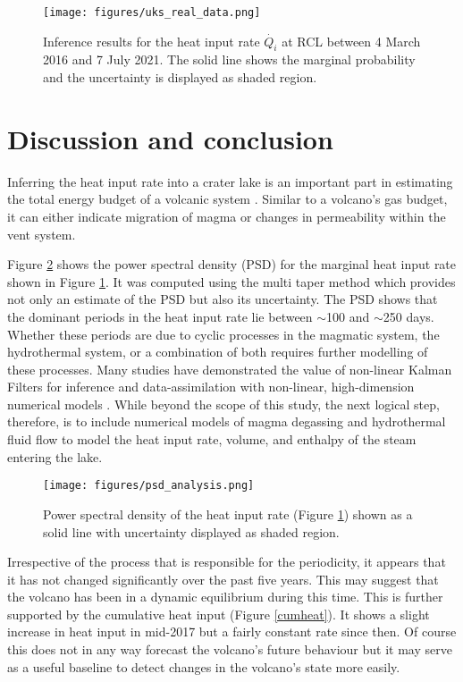\documentclass{bmcart}
\begin{document}
\begin{figure}
 	\texttt{[image: figures/uks\_real\_data.png]}  
 	\caption{Inference results for the heat input rate $\dot{Q_i}$ at RCL
             between 4 March 2016 and 7 July 2021. The solid line shows the
             marginal probability and the uncertainty is displayed as shaded
             region.}
\label{inference_result}
\end{figure}

\section{Discussion and conclusion}
Inferring the heat input rate into a crater lake is an important part in
estimating the total energy budget of a volcanic system \cite{Brown1989a}.
Similar to a volcano's gas budget, it can either indicate migration of magma or
changes in permeability within the vent system.

Figure \ref{psd} shows the power spectral density (PSD) for the marginal heat
input rate shown in Figure \ref{inference_result}. It was computed using the
multi taper method \cite{prietoComputersGeosciencesFortran2009} which provides
not only an estimate of the PSD but also its uncertainty. The PSD shows that the
dominant periods in the heat input rate lie between $\sim$100 and $\sim$250
days. Whether these periods are due to cyclic processes in the magmatic system,
the hydrothermal system, or a combination of both requires further modelling of
these processes. Many studies have demonstrated the value of non-linear Kalman
Filters for inference and data-assimilation with non-linear, high-dimension
numerical models \cite{White2018a}. While beyond the scope of this study, the
next logical step, therefore, is to include numerical models of magma degassing
and hydrothermal fluid flow to model the heat input rate, volume, and enthalpy
of the steam entering the lake.

\begin{figure}
    \texttt{[image: figures/psd\_analysis.png]}  
 	\caption{Power spectral density of the heat input rate 
             (Figure \ref{inference_result}) shown as a solid line
             with uncertainty displayed as shaded region.}
    \label{psd}
\end{figure}

Irrespective of the process that is responsible for the periodicity, it appears
that it has not changed significantly over the past five years. This may
suggest that the volcano has been in a dynamic equilibrium during this time.
This is further supported by the cumulative heat input (Figure \ref{cumheat}).
It shows a slight increase in heat input in mid-2017 but a fairly constant rate
since then. Of course this does not in any way forecast the volcano's future
behaviour but it may serve as a useful baseline to detect changes in the
volcano's state more easily.
\end{document}
